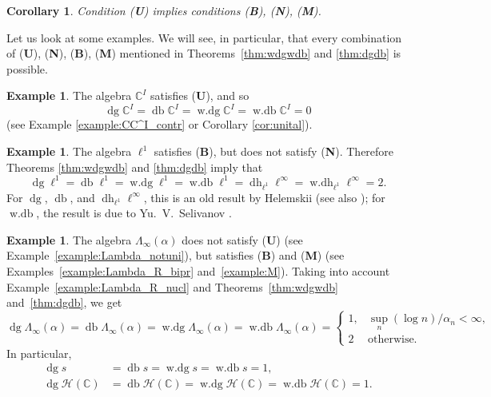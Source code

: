 \documentclass[12pt,reqno]{amsart}
\newtheorem{corollary}[theorem]{Corollary}
\theoremstyle{definition}
\newtheorem{example}[theorem]{Example}
\begin{document}
\begin{corollary}
Condition {\upshape ({\textbf{U}})} implies conditions {\upshape ({\textbf{B}}), ({\textbf{N}}), ({\textbf{M}})}.
\end{corollary}

Let us look at some examples. We will see, in particular, that every combination
of ({\textbf{U}}), ({\textbf{N}}), ({\textbf{B}}), ({\textbf{M}}) mentioned in Theorems~\ref{thm:wdgwdb}
and \ref{thm:dgdb} is possible.

\begin{example}
The algebra ${\mathbb C}^I$ satisfies {\upshape ({\textbf{U}})}, and so
\[
{\mathop{\mathrm{dg}}}{\mathbb C}^I={\mathop{\mathrm{db}}}{\mathbb C}^I={\mathop{\mathrm{w.dg}}}{\mathbb C}^I={\mathop{\mathrm{w.db}}}{\mathbb C}^I=0
\]
(see Example \ref{example:CC^I_contr} or Corollary \ref{cor:unital}).
\end{example}

\begin{example}
The algebra $\ell^1$ satisfies {\upshape ({\textbf{B}})},
but does not satisfy {\upshape ({\textbf{N}})}. Therefore Theorems \ref{thm:wdgwdb} and \ref{thm:dgdb}
imply that
\[
{\mathop{\mathrm{dg}}}\ell^1={\mathop{\mathrm{db}}}\ell^1={\mathop{\mathrm{w.dg}}}\ell^1={\mathop{\mathrm{w.db}}}\ell^1={\mathop{\mathrm{dh}}}\nolimits_{\ell^1}\ell^\infty
={\mathop{\mathrm{w.dh}}}\nolimits_{\ell^1}\ell^\infty=2.
\]
For ${\mathop{\mathrm{dg}}}$, ${\mathop{\mathrm{db}}}$, and ${\mathop{\mathrm{dh}}}_{\ell^1}\ell^\infty$, this is an old
result by Helemskii \cite{X_ne1} (see also \cite[V.2.16]{X1});
for ${\mathop{\mathrm{w.db}}}$, the result is due to Yu.~V.~Selivanov \cite{Sel_bifl}.
\end{example}

\begin{example}
The algebra $\Lambda_\infty(\alpha)$ does not satisfy ({\textbf{U}})
(see Example~\ref{example:Lambda_notuni}),
but satisfies ({\textbf{B}}) and ({\textbf{M}})
(see Examples~\ref{example:Lambda_R_bipr} and~\ref{example:M}).
Taking into account Example~\ref{example:Lambda_R_nucl}
and Theorems~\ref{thm:wdgwdb}
and~\ref{thm:dgdb}, we get
\[
{\mathop{\mathrm{dg}}}\Lambda_\infty(\alpha)={\mathop{\mathrm{db}}}\Lambda_\infty(\alpha)
={\mathop{\mathrm{w.dg}}}\Lambda_\infty(\alpha)={\mathop{\mathrm{w.db}}}\Lambda_\infty(\alpha)=
\begin{cases}
1, &  \sup_n (\log n)/\alpha_n<\infty,\\
2 & \text{otherwise.}
\end{cases}
\]
In particular,
\begin{align*}
{\mathop{\mathrm{dg}}} s&={\mathop{\mathrm{db}}} s={\mathop{\mathrm{w.dg}}} s={\mathop{\mathrm{w.db}}} s=1,\\
{\mathop{\mathrm{dg}}} {\mathscr H}({\mathbb C})&={\mathop{\mathrm{db}}} {\mathscr H}({\mathbb C})={\mathop{\mathrm{w.dg}}} {\mathscr H}({\mathbb C})={\mathop{\mathrm{w.db}}} {\mathscr H}({\mathbb C})=1.
\end{align*}
\end{example}
\end{document}
